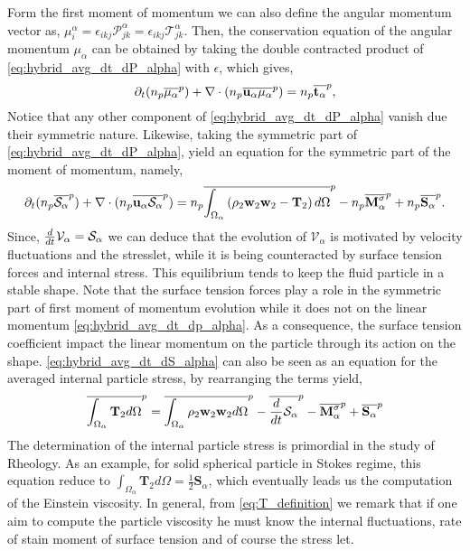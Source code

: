 Form the first moment of momentum we can also define the angular momentum vector as, $\mu^\alpha_i = \epsilon_{ikj} \mathcal{P}^\alpha_{jk} =  \epsilon_{ikj} \mathcal{T}^\alpha_{jk}$. 
Then, the conservation equation of the angular momentum $\mu_\alpha$ can be obtained by taking the double contracted product of \ref{eq:hybrid_avg_dt_dP_alpha} with $\epsilon$, which gives,
\begin{equation}
    \partial_t (n_p\overline{\mu_\alpha}^{p})
    + \mathbf{\nabla}\cdot (n_p\overline{  \textbf{u}_\alpha \mu_\alpha}^{p})
    =  
    n_p\overline{\textbf{t}_\alpha}^{p},
    \label{eq:hybrid_avg_dt_dmu_alpha}
\end{equation}
Notice that any other component of \ref{eq:hybrid_avg_dt_dP_alpha} vanish due their symmetric nature. 
Likewise, taking the symmetric part of \ref{eq:hybrid_avg_dt_dP_alpha}, yield an equation for the symmetric part of the moment of momentum, namely,
\begin{multline}    
    \partial_t (n_p\overline{\mathcal{S}_\alpha}^{p})
    + \mathbf{\nabla}\cdot (n_p\overline{  \textbf{u}_\alpha \mathcal{S}_\alpha}^{p})
    =  n_p\overline{\int_{\Omega_\alpha} \left(
        \rho_2\textbf{w}_2 \textbf{w}_2
        - \mathbf{T}_2
        \right) d\Omega}^{p}
        - n_p\overline{\textbf{M}_\alpha^\sigma}^{p}
        + n_p\overline{\textbf{S}_\alpha}^{p}.
    \label{eq:hybrid_avg_dt_dS_alpha}
\end{multline}
Since, $\frac{d}{d t} \mathcal{V}_\alpha = \mathcal{S}_\alpha$ we can deduce that the evolution of $\mathcal{V}_\alpha$ is motivated by velocity fluctuations and the stresslet, while it is being counteracted by surface tension forces and internal stress. 
This equilibrium tends to keep the fluid particle in a stable shape. 
Note that the surface tension forces play a role in the symmetric part of first moment of momentum evolution while it does not on the linear momentum \ref{eq:hybrid_avg_dt_dp_alpha}.
As a consequence, the surface tension coefficient impact the linear momentum on the particle through its action on the shape. 
\ref{eq:hybrid_avg_dt_dS_alpha} can also be seen as an equation for the averaged internal particle stress, by rearranging the terms yield, 
\begin{equation}    
    \overline{\int_{\Omega_\alpha}\mathbf{T}_2d\Omega}^{p}
    = \overline{ \int_{\Omega_\alpha} \rho_2 \textbf{w}_2 \textbf{w}_2d\Omega}^{p}
    - \overline{ \frac{d}{d t} \mathcal{S}_\alpha}^{p}
    - \overline{ \textbf{M}_\alpha^\sigma}^{p}
    + \overline{  \textbf{S}_\alpha}^{p}
    \label{eq:T_definition}
\end{equation}
The determination of the internal particle stress is primordial in the study of Rheology.
As an example, for solid spherical particle in Stokes regime, this equation reduce to $ \int_{\Omega_\alpha}\mathbf{T}_2d\Omega = \frac{1}{2}\textbf{S}_\alpha$, which eventually leads us the computation of the Einstein viscosity. 
In general, from \ref{eq:T_definition} we remark that if one aim to compute the particle viscosity he must know the internal fluctuations, rate of stain moment of surface tension and of course the stress let. 


